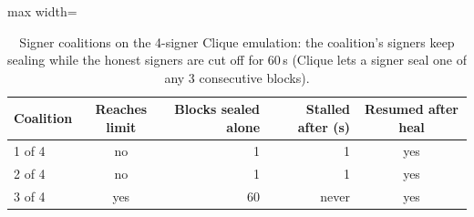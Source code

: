 \begin{table}[t]
\centering
\scriptsize
\caption{Signer coalitions on the 4-signer Clique emulation: the coalition's signers keep sealing while the honest signers are cut off for 60\,s (Clique lets a signer seal one of any 3 consecutive blocks).}
\label{tab:coalition}
\begin{adjustbox}{max width=\linewidth}
\begin{tabular}{lcrrc}
\toprule
Coalition & Reaches limit & Blocks sealed alone & Stalled after (s) & Resumed after heal \\
\midrule
1 of 4 & no & 1 & 1 & yes \\
2 of 4 & no & 1 & 1 & yes \\
3 of 4 & yes & 60 & never & yes \\
\bottomrule
\end{tabular}\end{adjustbox}
\end{table}
